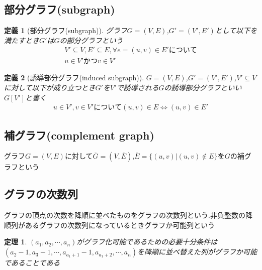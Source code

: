 \documentclass[a4j,10.5pt]{jarticle}
\newtheorem{defi}{定義}[section]
\newtheorem{theo}{定理}[section]
\begin{document}
\subsection{部分グラフ(subgraph)}
\begin{defi}[部分グラフ(subgraph)]
グラフ$G = (V,E)$,$G' = (V',E')$として以下を満たすとき$G'$は$G$の部分グラフという
\begin{eqnarray*}
V' \subseteq V,E' \subseteq E, 
\forall e = (u,v) \in E' について\\
u \in V' かつ v \in V'
\end{eqnarray*}
\end{defi}

\begin{defi}[誘導部分グラフ(induced subgraph)]
$G = (V,E)$,$G'=(V',E')$,$V'\subseteq V$に対して以下が成り立つとき$G'$を$V'$で誘導される$G$の誘導部分グラフといい$G[V']$と書く
\begin{eqnarray*}
u \in V',v \in V'について
(u,v) \in E \Leftrightarrow (u,v) \in E'
\end{eqnarray*}
\end{defi}

\subsection{補グラフ(complement graph)}
グラフ$G=(V,E)$に対して$\overline{G} = (V,\overline{E})$,$\overline{E} = \{(u,v)|(u,v) \notin E\}$を$G$の補グラフという

\subsection{グラフの次数列}
グラフの頂点の次数を降順に並べたものをグラフの次数列という.非負整数の降順列があるグラフの次数列になっているときグラフか可能列という

\begin{theo}
$(a_1,a_2,\cdots,a_n)$がグラフ化可能であるための必要十分条件は$(a_2 - 1,a_3 - 1,\cdots,a_{a_1 + 1} - 1,a_{a_1 + 2},\cdots,a_n)$を降順に並べ替えた列がグラフか可能であることである
\end{theo}
\end{document}
